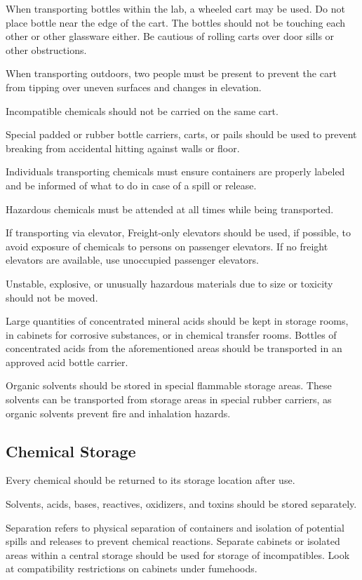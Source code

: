 \documentclass[12pt]{../SOP3}\usepackage[]{graphicx}\usepackage[]{color}
\begin{document}
\NP When transporting bottles within the lab, a wheeled cart may be used. Do not place bottle near the edge of the cart. The bottles should not be touching each other or other glassware either. Be cautious of rolling carts over door sills or other obstructions.

\NP When transporting outdoors, two people must be present to prevent the cart from tipping over uneven surfaces and changes in elevation.

\NP Incompatible chemicals should not be carried on the same cart. 

\NP Special padded or rubber bottle carriers, carts, or pails should be used to prevent breaking from accidental hitting against walls or floor. 

\NP Individuals transporting chemicals must ensure containers are properly labeled and be informed of what to do in case of a spill or release. 

\NP Hazardous chemicals must be attended at all times while being transported.

\NP If transporting via elevator, Freight-only elevators should be used, if possible, to avoid exposure of chemicals to persons on passenger elevators. If no freight elevators are available, use unoccupied passenger elevators.  

\NP Unstable, explosive, or unusually hazardous materials due to size or toxicity should not be moved. 

\NP Large quantities of concentrated mineral acids should be kept in storage rooms, in cabinets for corrosive substances, or in chemical transfer rooms. Bottles of concentrated acids from the aforementioned areas should be transported in an approved acid bottle carrier. 

\NP Organic solvents should be stored in special flammable storage areas. These solvents can be transported from storage areas in special rubber carriers, as organic solvents prevent fire and inhalation hazards. 

\subsection*{Chemical Storage}

\NP Every chemical should be returned to its storage location after use. 

\NP Solvents, acids, bases, reactives, oxidizers, and toxins should be stored separately.

\NP Separation refers to physical separation of containers and isolation of potential spills and releases to prevent chemical reactions. Separate cabinets or isolated areas within a central storage should be used for storage of incompatibles. Look at compatibility restrictions on cabinets under fumehoods. 
\end{document}
